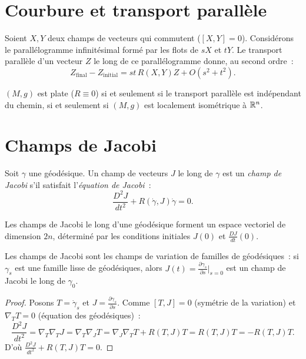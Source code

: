 \section{Courbure et transport parall\`ele}

\begin{theoreme}
Soient $X, Y$ deux champs de vecteurs qui commutent ($[X,Y] = 0$). Consid\'erons
le parall\'elogramme infinit\'esimal form\'e par les flots de $sX$ et $tY$. Le
transport parall\`ele d'un vecteur $Z$ le long de ce parall\'elogramme donne, au
second ordre~:
\[
    Z_{\text{final}} - Z_{\text{initial}} = st\, R(X,Y)Z + O(s^2 + t^2).
\]
\end{theoreme}

\begin{corollaire}[Platitude]
$(M, g)$ est plate ($R \equiv 0$) si et seulement si le transport parall\`ele
est ind\'ependant du chemin, si et seulement si $(M, g)$ est localement isom\'etrique
\`a $\mathbb{R}^n$.
\end{corollaire}

\section{Champs de Jacobi}

\begin{definition}
Soit $\gamma$ une g\'eod\'esique. Un champ de vecteurs $J$ le long de $\gamma$ est
un \emph{champ de Jacobi} s'il satisfait l'\emph{\'equation de Jacobi}~:
\[
    \frac{D^2 J}{dt^2} + R(\dot\gamma, J)\dot\gamma = 0.
\]
\end{definition}

\begin{proposition}
Les champs de Jacobi le long d'une g\'eod\'esique forment un espace vectoriel de
dimension $2n$, d\'etermin\'e par les conditions initiales $J(0)$ et $\frac{DJ}{dt}(0)$.
\end{proposition}

\begin{theoreme}
Les champs de Jacobi sont les champs de variation de familles de g\'eod\'esiques~:
si $\gamma_s$ est une famille lisse de g\'eod\'esiques, alors
$J(t) = \frac{\partial\gamma_s}{\partial s}\big|_{s=0}$ est un champ de Jacobi
le long de $\gamma_0$.
\end{theoreme}

\begin{proof}
Posons $T = \dot\gamma_s$ et $J = \frac{\partial\gamma_s}{\partial s}$.
Comme $[T, J] = 0$ (sym\'etrie de la variation) et $\nabla_T T = 0$ (\'equation
des g\'eod\'esiques)~:
\[
    \frac{D^2 J}{dt^2} = \nabla_T\nabla_T J = \nabla_T\nabla_J T
    = \nabla_J\nabla_T T + R(T,J)T = R(T,J)T = -R(T,J)T.
\]
D'o\`u $\frac{D^2 J}{dt^2} + R(T, J)T = 0$.
\end{proof}

